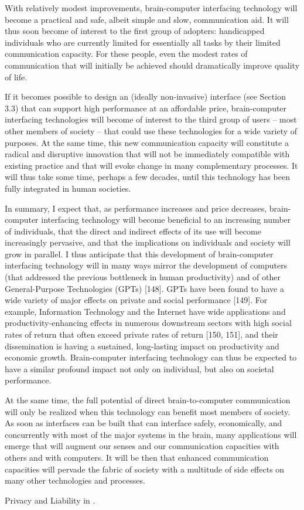 \documentclass[fleqn,11pt]{olplainarticle}
\begin{document}
With relatively modest improvements, brain-computer interfacing technology will become a practical and safe, albeit simple and slow, communication aid. It will thus soon become of interest to the first group of adopters: handicapped individuals who are currently limited for essentially all tasks by their limited communication capacity. For these people, even the modest rates of communication that will initially be achieved should dramatically improve quality of life.\cite{schalk2008brain}

If it becomes possible to design an (ideally non-invasive) interface (see Section 3.3) that can support high performance at an affordable price, brain-computer interfacing technologies will become of interest to the third group of users – most other members of society – that could use these technologies for a wide variety of purposes. At the same time, this new communication capacity will constitute a radical and disruptive innovation that will not be immediately compatible with existing practice and that will evoke change in many complementary processes. It will thus take some time, perhaps a few decades, until this technology has been fully integrated in human societies.

In summary, I expect that, as performance increases and price decreases, brain- computer interfacing technology will become beneficial to an increasing number of individuals, that the direct and indirect effects of its use will become increasingly pervasive, and that the implications on individuals and society will grow in parallel. I thus anticipate that this development of brain-computer interfacing technology will in many ways mirror the development of computers (that addressed the previous bottleneck in human productivity) and of other General-Purpose Technologies (GPTs) [148]. GPTs have been found to have a wide variety of major effects on private and social performance [149]. For example, Information Technology and the Internet have wide applications and productivity-enhancing effects in numerous downstream sectors with high social rates of return that often exceed private rates of return [150, 151], and their dissemination is having a sustained, long-lasting impact on productivity and economic growth. Brain-computer interfacing technology can thus be expected to have a similar profound impact not only on individual, but also on societal performance.
\cite{schalk2008brain}

At the same time, the full potential of direct brain-to-computer communication will only be realized when this technology can benefit most members of society. As soon as interfaces can be built that can interface safely, economically, and concurrently with most of the major systems in the brain, many applications will emerge that will augment our senses and our communication capacities with others and with computers. It will be then that enhanced communication capacities will pervade the fabric of society with a multitude of side effects on many other technologies and processes.\cite{schalk2008brain}

Privacy and Liability in \cite{schalk2008brain}.

\printbibliography
\end{document}
